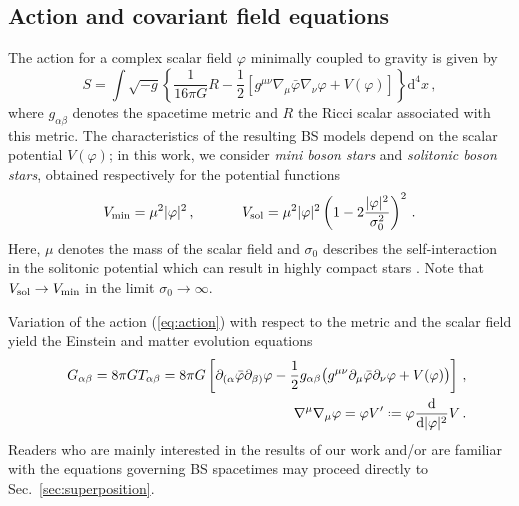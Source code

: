 \documentclass[11pt]{report}  %
\newcommand{\du}{\mathrm{d}}
\newcommand*{\defeq}{\mathrel{\vcenter{\baselineskip0.5ex \lineskiplimit0pt
                     \hbox{\scriptsize.}\hbox{\scriptsize.}}}%
                     =}
\begin{document}
\subsection{Action and covariant field equations}
%
The action for a complex scalar field $\varphi$ minimally coupled to gravity is given by
%
\begin{equation}
S = \int\sqrt{-g}\left\{
  \frac{1}{16\pi G}R - \frac{1}{2}\left[ 
  g^{\mu \nu}\nabla_{\mu}\bar{\varphi}\nabla_{\nu}\varphi
  + V(\varphi)\right] \right\} \du^4 x\,,
  \label{eq:action}
\end{equation}
%
where $g_{\alpha\beta}$ denotes the spacetime metric and $R$ the
Ricci scalar associated with this metric. The characteristics
of the resulting BS models depend on the scalar potential
$V(\varphi)$; in this work, we consider {\it mini boson stars}
and {\it solitonic boson stars}, obtained respectively
for the potential functions
%
\begin{equation}
  V_{\rm min} = \mu^2 |\varphi|^2\,,~~~~~~~~~~
  V_{\rm sol} = \mu^2 |\varphi|^2\left(1-2\frac{|\varphi|^2}{\sigma_0^2}
  \right)^2\,.
  \label{eq:pot}
\end{equation}
%
Here, $\mu$ denotes the mass of the scalar field and $\sigma_0$
describes the self-interaction in the solitonic potential
which can result in highly compact stars
\cite{Lee:1986ts}. Note that $V_{\rm sol}\rightarrow 
V_{\rm min}$ in the limit $\sigma_0\rightarrow \infty$.

Variation of the action (\ref{eq:action}) with respect to the
metric and the scalar field yield the Einstein and matter
evolution equations
%
\begin{eqnarray}
  &&G_{\alpha\beta} = 8\pi G T_{\alpha\beta}
  = 8\pi G\left[
  \partial_{(\alpha}\bar{\varphi}\partial_{\beta)}\varphi
  -\frac{1}{2}g_{\alpha\beta}
  \big(
  g^{\mu\nu}\partial_{\mu}
  \bar{\varphi}\partial_{\nu}\varphi+ V(\varphi)
  \big)
  \right]\,, \label{eq:Einstein} \\
  &&\nabla^{\mu}\nabla_{\mu}\varphi = \varphi V'
  \defeq \varphi \frac{\du}{\du |\varphi|^2}
  V\,.
  \label{eq:Boxvarphi}
\end{eqnarray}
%
Readers who are mainly interested in the results of our work
and/or are familiar with the equations governing BS spacetimes
may proceed directly to Sec.~\ref{sec:superposition}.

\end{document}
